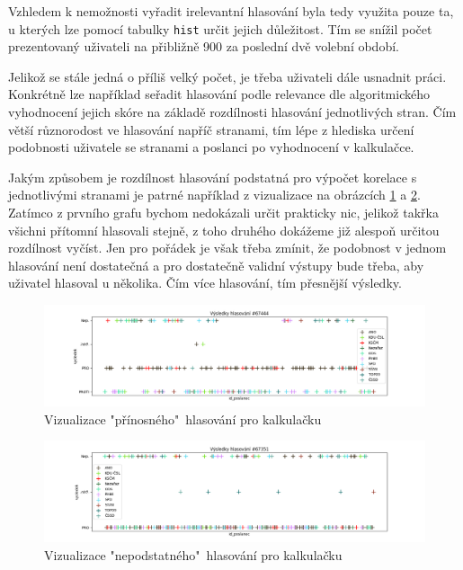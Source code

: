 \par Vzhledem k nemožnosti vyřadit irelevantní hlasování byla tedy využita pouze ta, u kterých lze pomocí tabulky \texttt{hist} určit jejich důležitost. Tím se snížil počet prezentovaný uživateli na přibližně 900 za poslední dvě volební období.\\ 

\par Jelikož se stále jedná o příliš velký počet, je třeba uživateli dále usnadnit práci. Konkrétně lze například seřadit hlasování podle relevance dle algoritmického vyhodnocení jejich skóre na základě rozdílnosti hlasování jednotlivých stran. Čím větší různorodost ve hlasování napříč stranami, tím lépe z hlediska určení podobnosti uživatele se stranami a poslanci po vyhodnocení v kalkulačce. \\

\par Jakým způsobem je rozdílnost hlasování podstatná pro výpočet korelace s jednotlivými stranami je patrné například z vizualizace na obrázcích \ref{fig:analyza-rozdilne} a \ref{fig:analyza-stejne}. Zatímco z prvního grafu bychom nedokázali určit prakticky nic, jelikož takřka všichni přítomní hlasovali stejně, z toho druhého dokážeme již alespoň určitou rozdílnost vyčíst. Jen pro pořádek je však třeba zmínit, že podobnost v jednom hlasování není dostatečná a pro dostatečně validní výstupy bude třeba, aby uživatel hlasoval u několika. Čím více hlasování, tím přesnější výsledky.

\begin{figure}
    \centering
    \includegraphics[width=1\textwidth]{obrazky-figures/analyza_hl_rozdilne.png}
    \caption{Vizualizace "přínosného"\ hlasování pro kalkulačku}
    \label{fig:analyza-rozdilne}
\end{figure}

\begin{figure}
    \centering
    \includegraphics[width=1\textwidth]{obrazky-figures/analyza_hl_stejne.png}
    \caption{Vizualizace "nepodstatného"\ hlasování pro kalkulačku}
    \label{fig:analyza-stejne}
\end{figure}

